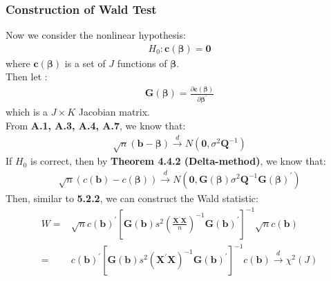 \documentclass{article}
\begin{document}
\subsubsection{Construction of Wald Test}
Now we consider the nonlinear hypothesis:
	\begin{align*}
		H_0: \boldsymbol{c}(\boldsymbol{\beta}) = \boldsymbol{0}
	\end{align*}
where $\boldsymbol{c}(\boldsymbol{\beta})$ is a set of $J$ functions of $\boldsymbol{\beta}$.\\
Then let :
	\begin{align*}
		\boldsymbol{G}(\boldsymbol{\beta}) = \frac{\partial \boldsymbol{c}(\boldsymbol{\beta})}{\partial \boldsymbol{\beta}^\prime}
	\end{align*}
which is a $J \times K$ Jacobian matrix.\\
From \textbf{A.1, A.3, A.4, A.7}, we know that:
	\begin{align*}
		\sqrt{n}(\boldsymbol{b} - \boldsymbol{\beta}) \xrightarrow{d} N(\boldsymbol{0}, \sigma^2 \boldsymbol{Q}^{-1})
	\end{align*}
If $H_0$ is correct, then by \textbf{Theorem 4.4.2 (Delta-method)}, we know that:
	\begin{align*}
		\sqrt{n}(c(\boldsymbol{b}) - c(\boldsymbol{\beta})) \xrightarrow{d} N(\boldsymbol{0}, \boldsymbol{G}(\boldsymbol{\beta}) \sigma^2 \boldsymbol{Q}^{-1} \boldsymbol{G}(\boldsymbol{\beta})^\prime)
	\end{align*}
Then, similar to \textbf{5.2.2}, we can construct the Wald statistic:
	\begin{align*}
		W = &\sqrt{n} c(\boldsymbol{b})^\prime \left[\boldsymbol{G}(\boldsymbol{b}) s^2 \left( \frac{\boldsymbol{X}^\prime \boldsymbol{X}}{n} \right)^{-1} \boldsymbol{G}(\boldsymbol{b})^\prime \right]^{-1} \sqrt{n} c(\boldsymbol{b}) \\= &
		c(\boldsymbol{b})^\prime \left[\boldsymbol{G}(\boldsymbol{b}) s^2 \left( \boldsymbol{X}^\prime \boldsymbol{X} \right)^{-1} \boldsymbol{G}(\boldsymbol{b})^\prime \right]^{-1} c(\boldsymbol{b}) \xrightarrow{d} \chi^2(J)
	\end{align*}
\end{document}
